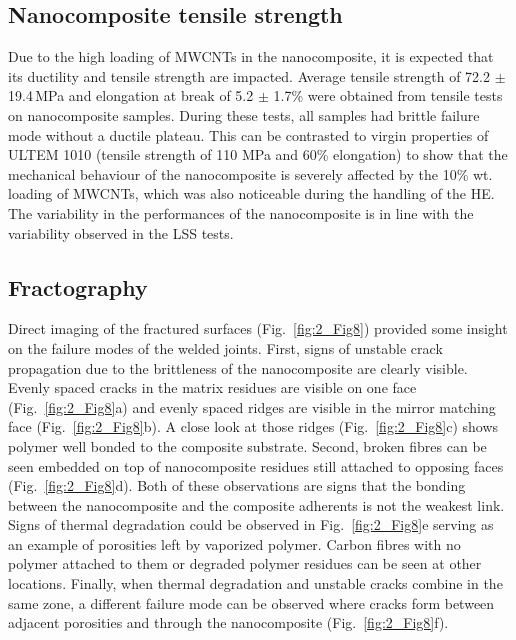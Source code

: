 \FloatBarrier
\subsection{Nanocomposite tensile strength}

Due to the high loading of MWCNTs in the nanocomposite, it is expected that its ductility and tensile strength are impacted. 
Average tensile strength of 72.2 $\pm$ \mbox{19.4\,MPa} and elongation at break of 5.2 $\pm$ 1.7\% were obtained from tensile tests on nanocomposite samples. 
During these tests, all samples had brittle failure mode without a ductile plateau. 
This can be contrasted to virgin properties of ULTEM 1010 (tensile strength of 110 MPa and 60\% elongation) to show that the mechanical behaviour of the nanocomposite is severely affected by the 10\% wt. loading of MWCNTs, which was also noticeable during the handling of the HE. 
The variability in the performances of the nanocomposite is in line with the variability observed in the LSS tests. 

\subsection{Fractography}

Direct imaging of the fractured surfaces (\mbox{Fig.~\ref{fig:2_Fig8}}) provided some insight on the failure modes of the welded joints. 
First, signs of unstable crack propagation due to the brittleness of the nanocomposite are clearly visible. 
Evenly spaced cracks in the matrix residues are visible on one face (\mbox{Fig.~\ref{fig:2_Fig8}}a) and evenly spaced ridges are visible in the mirror matching face (\mbox{Fig.~\ref{fig:2_Fig8}}b). 
A close look at those ridges (\mbox{Fig.~\ref{fig:2_Fig8}}c) shows polymer well bonded to the composite substrate. 
Second, broken fibres can be seen embedded on top of nanocomposite residues still attached to opposing faces (\mbox{Fig.~\ref{fig:2_Fig8}}d). 
Both of these observations are signs that the bonding between the nanocomposite and the composite adherents is not the weakest link. 
Signs of thermal degradation could be observed in \mbox{Fig.~\ref{fig:2_Fig8}}e serving as an example of porosities left by vaporized polymer. 
Carbon fibres with no polymer attached to them or degraded polymer residues can be seen at other locations. 
Finally, when thermal degradation and unstable cracks combine in the same zone, a different failure mode can be observed where cracks form between adjacent porosities and through the nanocomposite (\mbox{Fig.~\ref{fig:2_Fig8}}f).


